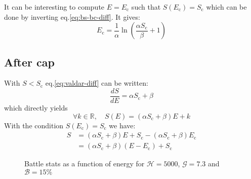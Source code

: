 \documentclass[12pt]{article}
\def\happy{\mathcal{H}}
\def\gym{\mathcal{G}}
\def\bonus{\mathcal{B}}
\def\Sc{S_\text{c}}
\def\Ec{E_\text{c}}
\begin{document}
It can be interesting to compute $E=\Ec$ such that $S(\Ec)=\Sc$ which can be done by inverting eq.\eqref{eq:bs-bc-diff}. It gives:
\begin{equation}
    \Ec = \frac{1}{\alpha}\ln\left(\frac{\alpha \Sc}{\beta} +1 \right)
\end{equation}

\subsection{After cap}
With $S<\Sc$ eq.\eqref{eq:valdar-diff} can be written:
\begin{equation}
    \frac{dS}{dE}  = \alpha \Sc + \beta
\end{equation}
which directly yields
\begin{equation}
    \forall k \in \mathbb{R},\quad S(E)  = (\alpha \Sc + \beta) E + k
\end{equation}
With the condition $S(\Ec)=\Sc$ we have:
\begin{equation}
    \begin{aligned}
        S & = (\alpha \Sc + \beta)E + \Sc - (\alpha \Sc + \beta) \Ec \\
          & = (\alpha \Sc + \beta) (E - \Ec) + \Sc
    \end{aligned}
\end{equation}
\begin{figure}[!h]
    \centering

    \caption{Battle stats as a function of energy for $\happy = 5000$, $\gym = 7.3$ and $\bonus= 15\%$}
\end{figure}
\end{document}
